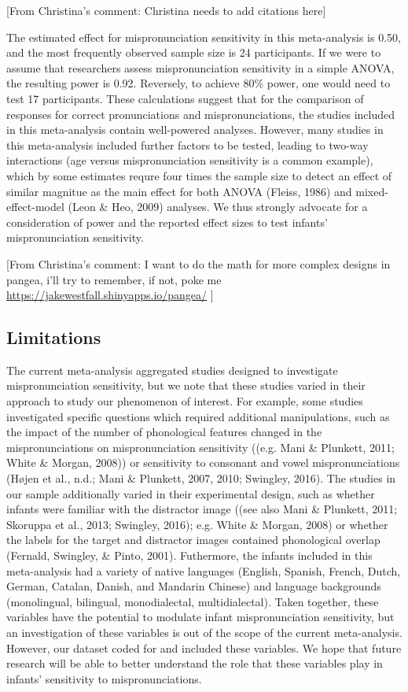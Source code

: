 \documentclass[man]{apa6}
\theoremstyle{definition}
\theoremstyle{definition}
\theoremstyle{definition}
\theoremstyle{remark}
\begin{document}
{[}From Christina's comment: Christina needs to add citations here{]}

The estimated effect for mispronunciation sensitivity in this
meta-analysis is 0.50, and the most frequently observed sample size is
24 participants. If we were to assume that researchers assess
mispronunciation sensitivity in a simple ANOVA, the resulting power is
0.92. Reversely, to achieve 80\% power, one would need to test 17
participants. These calculations suggest that for the comparison of
responses for correct pronunciations and mispronunciations, the studies
included in this meta-analysis contain well-powered analyses. However,
many studies in this meta-analysis included further factors to be
tested, leading to two-way interactions (age versus mispronunciation
sensitivity is a common example), which by some estimates requre four
times the sample size to detect an effect of similar magnitue as the
main effect for both ANOVA (Fleiss, 1986) and mixed-effect-model (Leon
\& Heo, 2009) analyses. We thus strongly advocate for a consideration of
power and the reported effect sizes to test infants' mispronunciation
sensitivity.

{[}From Christina's comment: I want to do the math for more complex
designs in pangea, i'll try to remember, if not, poke me
\url{https://jakewestfall.shinyapps.io/pangea/} {]}

\subsection{Limitations}\label{limitations}

The current meta-analysis aggregated studies designed to investigate
mispronunciation sensitivity, but we note that these studies varied in
their approach to study our phenomenon of interest. For example, some
studies investigated specific questions which required additional
manipulations, such as the impact of the number of phonological features
changed in the mispronunciations on mispronunciation sensitivity ((e.g.
Mani \& Plunkett, 2011; White \& Morgan, 2008)) or sensitivity to
consonant and vowel mispronunciations (Højen et al., n.d.; Mani \&
Plunkett, 2007, 2010; Swingley, 2016). The studies in our sample
additionally varied in their experimental design, such as whether
infants were familiar with the distractor image ((see also Mani \&
Plunkett, 2011; Skoruppa et al., 2013; Swingley, 2016); e.g. White \&
Morgan, 2008) or whether the labels for the target and distractor images
contained phonological overlap (Fernald, Swingley, \& Pinto, 2001).
Futhermore, the infants included in this meta-analysis had a variety of
native languages (English, Spanish, French, Dutch, German, Catalan,
Danish, and Mandarin Chinese) and language backgrounds (monolingual,
bilingual, monodialectal, multidialectal). Taken together, these
variables have the potential to modulate infant mispronunciation
sensitivity, but an investigation of these variables is out of the scope
of the current meta-analysis. However, our dataset coded for and
included these variables. We hope that future research will be able to
better understand the role that these variables play in infants'
sensitivity to mispronunciations.
\end{document}
